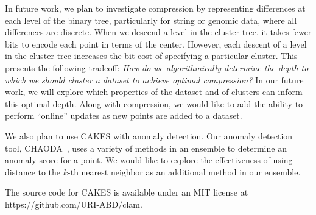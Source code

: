 In future work, we plan to investigate compression by representing differences at each level of the
binary tree, particularly for string or genomic data, where all differences are discrete.
When we descend a level in the cluster tree, it takes fewer bits to encode each point in terms of the center. 
However, each descent of a level in the cluster tree increases the bit-cost of specifying a particular cluster. 
This presents the following tradeoff: \emph{How do we algorithmically determine the depth to which we should cluster a dataset to achieve optimal compression?} 
In our future work, we will explore which properties of the dataset and of clusters can inform this optimal depth.
Along with compression, we would like to add the ability to perform ``online'' updates as new points are added to a dataset.

We also plan to use CAKES with anomaly detection. Our anomaly detection tool, CHAODA~\cite{ishaq2021clustered}, uses 
a variety of methods in an ensemble to determine an anomaly score for a point. We would like to explore the effectiveness of using
distance to the $k$-th nearest neighbor as an additional method in our ensemble.

The source code for CAKES is available under an MIT
license at https://github.com/URI-ABD/clam.

